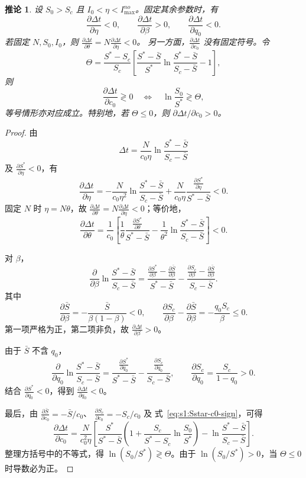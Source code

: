 \documentclass[UTF8,a4paper,10pt,fontset=fandol]{ctexart}
\theoremstyle{cnplain}
\newtheorem{corollaryn}[theorem]{推论}
\theoremstyle{remark}
\numberwithin{equation}{section}
\begin{document}
\begin{corollaryn}
\label{cor:s1:duration-sensitivity}
设 $S_0>S_c$ 且 $I_0<\eta<I_{\max}^{no}$。固定其余参数时，有
\[
\frac{\partial \Delta t}{\partial \eta}<0,
\qquad
\frac{\partial \Delta t}{\partial \beta}>0,
\qquad
\frac{\partial \Delta t}{\partial q_0}<0.
\]
若固定 $N,S_0,I_0$，则
$\frac{\partial \Delta t}{\partial \theta}=N\frac{\partial \Delta t}{\partial \eta}<0$。
另一方面，$\frac{\partial \Delta t}{\partial c_0}$ 没有固定符号。令
\[
\Theta
=
\frac{S^*-S_c}{S_c}
\left[
\frac{S^*-\bar S}{S^*}
\ln\frac{S^*-\bar S}{S_c-\bar S}
-1
\right],
\]
则
\[
\frac{\partial\Delta t}{\partial c_0}
\gtrless0
\quad\Longleftrightarrow\quad
\ln\frac{S_0}{S^*}
\gtrless\Theta,
\]
等号情形亦对应成立。特别地，若 $\Theta\le0$，则
$\partial\Delta t/\partial c_0>0$。
\end{corollaryn}

\begin{proof}
由
\[
\Delta t
=
\frac{N}{c_0\eta}
\ln\frac{S^*-\bar S}{S_c-\bar S}
\]
及 $\frac{\partial S^*}{\partial \eta}<0$，有
\[
\frac{\partial\Delta t}{\partial\eta}
=
-\frac{N}{c_0\eta^2}
\ln\frac{S^*-\bar S}{S_c-\bar S}
+
\frac{N}{c_0\eta}
\frac{\frac{\partial S^*}{\partial \eta}}{S^*-\bar S}
<0.
\]
固定 $N$ 时 $\eta=N\theta$，故
$\frac{\partial \Delta t}{\partial \theta}=N\frac{\partial \Delta t}{\partial \eta}<0$；等价地，
\[
\frac{\partial\Delta t}{\partial\theta}
=
\frac1{c_0}
\left[
\frac1{\theta}
\frac{\frac{\partial S^*}{\partial \theta}}{S^*-\bar S}
-
\frac1{\theta^2}
\ln\frac{S^*-\bar S}{S_c-\bar S}
\right]<0.
\]

对 $\beta$，
\[
\frac{\partial}{\partial\beta}
\ln\frac{S^*-\bar S}{S_c-\bar S}
=
\frac{\frac{\partial S^*}{\partial \beta}-\frac{\partial \bar S}{\partial \beta}}{S^*-\bar S}
-
\frac{\frac{\partial S_c}{\partial \beta}-\frac{\partial \bar S}{\partial \beta}}{S_c-\bar S}.
\]
其中
\[
\frac{\partial \bar S}{\partial \beta}
=
-\frac{\bar S}{\beta(1-\beta)}<0,
\qquad
\frac{\partial S_c}{\partial \beta}-\frac{\partial \bar S}{\partial \beta}
=
-\frac{q_0S_c}{\beta}\le0.
\]
第一项严格为正，第二项非负，故 $\frac{\partial \Delta t}{\partial \beta}>0$。

由于 $\bar S$ 不含 $q_0$，
\[
\frac{\partial}{\partial q_0}
\ln\frac{S^*-\bar S}{S_c-\bar S}
=
\frac{\frac{\partial S^*}{\partial q_0}}{S^*-\bar S}
-
\frac{\frac{\partial S_c}{\partial q_0}}{S_c-\bar S},
\qquad
\frac{\partial S_c}{\partial q_0}
=
\frac{S_c}{1-q_0}>0.
\]
结合 $\frac{\partial S^*}{\partial q_0}<0$，得到 $\frac{\partial \Delta t}{\partial q_0}<0$。

最后，由
$\frac{\partial \bar S}{\partial c_0}=-\bar S/c_0$、
$\frac{\partial S_c}{\partial c_0}=-S_c/c_0$ 及
式~\eqref{eq:s1:Sstar-c0-sign}，可得
\[
\frac{\partial\Delta t}{\partial c_0}
=
\frac{N}{c_0^2\eta}
\left[
\frac{S^*}{S^*-\bar S}
\left(
1+
\frac{S_c}{S^*-S_c}
\ln\frac{S_0}{S^*}
\right)
-
\ln\frac{S^*-\bar S}{S_c-\bar S}
\right].
\]
整理方括号中的不等式，得
$\ln(S_0/S^*)\gtrless\Theta$。由于
$\ln(S_0/S^*)>0$，当 $\Theta\le0$ 时导数必为正。
\end{proof}
\end{document}

